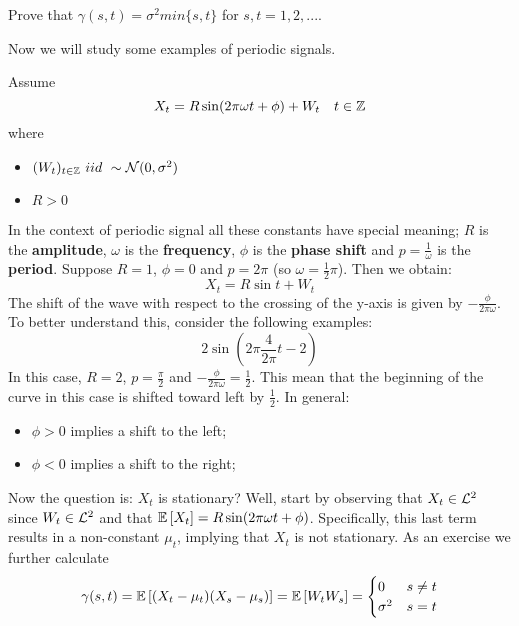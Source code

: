 \begin{exercise}
    Prove that $\gamma(s,t)=\sigma^2min\{s,t\}$ for $s,t=1,2,...$.
\end{exercise}

Now we will study some examples of periodic signals.

\begin{example}
    Assume
    \[
        X_t=R\sin(2\pi\omega t+\phi)+W_t\ \ \ t\in\Z    
    \]
    where
    \begin{itemize}
        \item $(W_t)_{t\in\Z}\ iid\ \sim\mathcal{N}(0,\sigma^2)$
        \item $R>0$ 
    \end{itemize}
    In the context of periodic signal all these constants have special meaning; $R$ is the \textbf{amplitude}, $\omega$ is the \textbf{frequency}, $\phi$ is the \textbf{phase shift} and $p=\frac{1}{\omega}$ is the \textbf{period}. Suppose $R=1$, $\phi=0$ and $p=2\pi$ (so $\omega=\frac{1}{2}\pi$). Then we obtain:
    \[
        X_t=R\sin t+W_t
    \]
    The shift of the wave with respect to the crossing of the y-axis is given by $-\frac{\phi}{2\pi\omega}$. To better understand this, consider the following examples:
    \[
        2\sin\left(2\pi\frac{4}{2\pi}t-2\right)  
    \]
    In this case, $R=2$, $p=\frac{\pi}{2}$ and $-\frac{\phi}{2\pi\omega}=\frac{1}{2}$. This mean that the beginning of the curve in this case is shifted toward left by $\frac{1}{2}$. In general:
    \begin{itemize}
        \item $\phi>0$ implies a shift to the left;
        \item $\phi<0$ implies a shift to the right;
    \end{itemize}
    Now the question is: $X_t$ is stationary? Well, start by observing that $X_t\in\mathcal{L}^{2}$ since $W_t\in\mathcal{L}^{2}$ and that $\mathbb{E}\left[X_t\right]=R\sin(2\pi\omega t+\phi)$. Specifically, this last term results in a non-constant $\mu_t$, implying that $X_t$ is not stationary. As an exercise we further calculate 
    \[
        \gamma(s,t)=\mathbb{E}\left[(X_t-\mu_t)(X_s-\mu_s)\right]=\mathbb{E}\left[W_tW_s\right]=
        \begin{cases}
            0 & s\ne t\\
            \sigma^2 & s=t
        \end{cases}  
    \]
\end{example}

